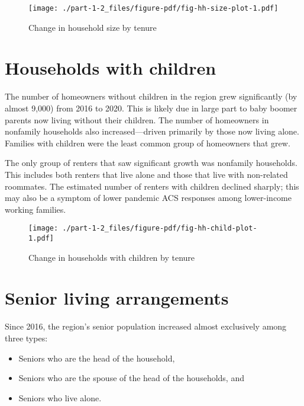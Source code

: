 \documentclass[
  letterpaper,
  DIV=11,
  numbers=noendperiod]{scrreprt}
\providecommand{\tightlist}{%
  \setlength{\itemsep}{0pt}\setlength{\parskip}{0pt}}\usepackage{longtable,booktabs,array}
\begin{document}
\begin{figure}

{\centering \texttt{[image: ./part-1-2\_files/figure-pdf/fig-hh-size-plot-1.pdf]}

}

\caption{\label{fig-hh-size-plot}Change in household size by tenure}

\end{figure}

\hypertarget{households-with-children}{%
\section{Households with children}\label{households-with-children}}

The number of homeowners without children in the region grew
significantly (by almost 9,000) from 2016 to 2020. This is likely due in
large part to baby boomer parents now living without their children. The
number of homeowners in nonfamily households also increased---driven
primarily by those now living alone. Families with children were the
least common group of homeowners that grew.

The only group of renters that saw significant growth was nonfamily
households. This includes both renters that live alone and those that
live with non-related roommates. The estimated number of renters with
children declined sharply; this may also be a symptom of lower pandemic
ACS responses among lower-income working families.

\begin{figure}

{\centering \texttt{[image: ./part-1-2\_files/figure-pdf/fig-hh-child-plot-1.pdf]}

}

\caption{\label{fig-hh-child-plot}Change in households with children by
tenure}

\end{figure}

\hypertarget{senior-living-arrangements}{%
\section{Senior living arrangements}\label{senior-living-arrangements}}

Since 2016, the region's senior population increased almost exclusively
among three types:

\begin{itemize}
\tightlist
\item
  Seniors who are the head of the household,
\item
  Seniors who are the spouse of the head of the households, and
\item
  Seniors who live alone.
\end{itemize}
\end{document}
